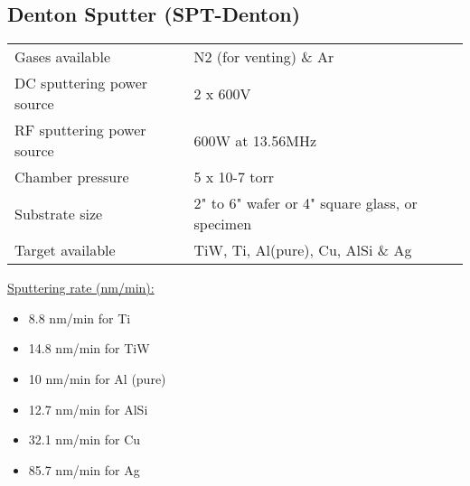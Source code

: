 \subsection{Denton Sputter (SPT-Denton)}\label{denton_sputter_machine}

\begin{minipage}[H]{\MachinePictureMiniPageWidth}
\end{minipage}\begin{minipage}[H]{\MachineTextMiniPageWidth}
	\begin{tabular}{|p{3cm}|p{8cm}|}
		\hline
		Gases available &
		N2 (for venting) \& Ar \\
		DC sputtering power source &
		2 x 600V \\
		RF sputtering power source &
		600W at 13.56MHz \\
		Chamber pressure &
		5 x 10-7 torr \\
		Substrate size &
		2" to 6" wafer or 4" square glass, or specimen \\
		Target available &
		TiW, Ti, Al(pure), Cu, AlSi \& Ag \\
		\hline
	\end{tabular}

	\underline{Sputtering rate (nm/min):}
	
	\begin{itemize}
		\item 8.8 nm/min for Ti
		\item 14.8 nm/min for TiW
		\item 10 nm/min for Al (pure)
		\item 12.7 nm/min for AlSi
		\item 32.1 nm/min for Cu
		\item 85.7 nm/min for Ag	
	\end{itemize}

\end{minipage}